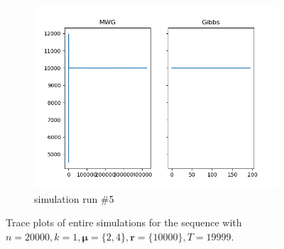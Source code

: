 \begin{figure}[H]
\begin{subfigure}{.3\textwidth}
    	\includegraphics[width=\linewidth]{../../plots/Trace_M2_N20000_NMCMC3_seed4_diffind2.png}
    	\caption{simulation run \#5}
	\end{subfigure}
	\caption{Trace plots of entire simulations for the sequence with $n=20000, k=1, \bm{\mu} = \{2,4\}, \bm{r} = \{10000\}, T=19999$.}
\end{figure}

